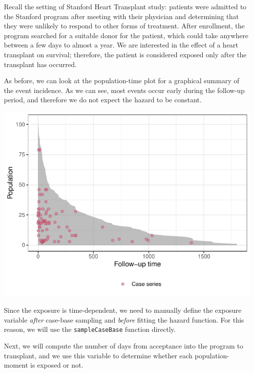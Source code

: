 \documentclass[
]{jss}
\begin{document}
Recall the setting of Stanford Heart Transplant study: patients were
admitted to the Stanford program after meeting with their physician and
determining that they were unlikely to respond to other forms of
treatment. After enrollment, the program searched for a suitable donor
for the patient, which could take anywhere between a few days to almost
a year. We are interested in the effect of a heart transplant on
survival; therefore, the patient is considered exposed only after the
transplant has occurred.

As before, we can look at the population-time plot for a graphical
summary of the event incidence. As we can see, most events occur early
during the follow-up period, and therefore we do not expect the hazard
to be constant.

\begin{CodeChunk}


\begin{center}\includegraphics[width=\textwidth,keepaspectratio=true]{../figures/stanford-poptime-1} \end{center}

\end{CodeChunk}

Since the exposure is time-dependent, we need to manually define the
exposure variable \emph{after} case-base sampling and \emph{before}
fitting the hazard function. For this reason, we will use the
\texttt{sampleCaseBase} function directly.

Next, we will compute the number of days from acceptance into the
program to transplant, and we use this variable to determine whether
each population-moment is exposed or not.
\end{document}
